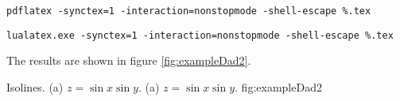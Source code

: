 \verb|pdflatex -synctex=1 -interaction=nonstopmode -shell-escape %.tex|

\verb|lualatex.exe -synctex=1 -interaction=nonstopmode -shell-escape %.tex|




The results are shown in figure  \ref{fig:exampleDad2}. 
\vspace{1cm} 

\twographs
      { }
      { }
      {Isolines. 
      (a) $ z = \sin x \sin y$. 
      (a) $ z = \sin x \sin y$. 
      }
      {fig:exampleDad2}      
